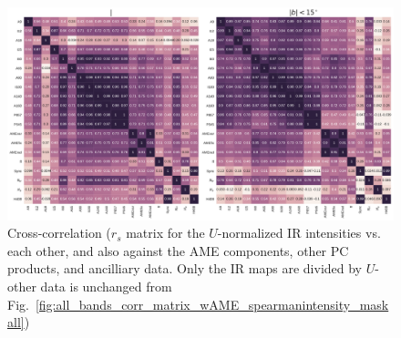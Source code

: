             \begin{figure}
              \includegraphics[width=\textwidth]{../Plots/ch_allsky/all_bands_corr_matrix_wAME_spearmanU_norm_masked.pdf}
              \centering
              \caption{Cross-correlation ($r_{s}$ matrix for the $U$-normalized IR intensities vs. each other, and also against the AME components, other PC products, and ancilliary data. Only the IR maps are divided by $U$- other data is unchanged from Fig.~\ref{fig:all_bands_corr_matrix_wAME_spearmanintensity_maskall})}
              \label{fig:all_bands_corr_matrix_wAME_spearmanU_norm_masked}
            \end{figure}

